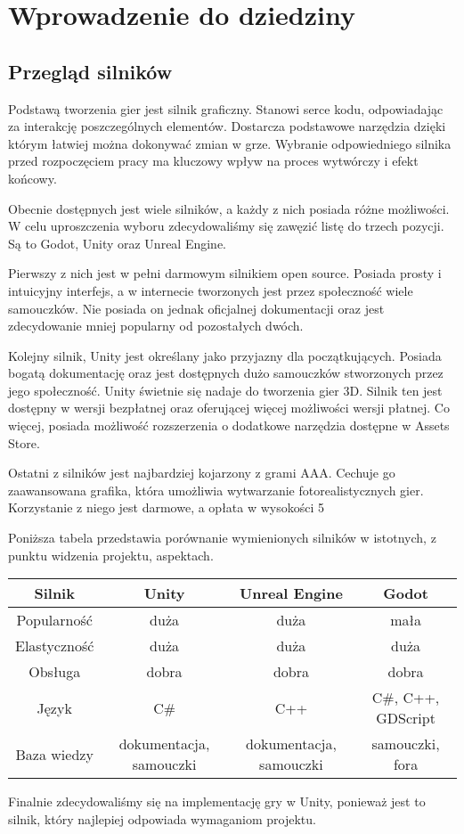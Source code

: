 \chapter{Wprowadzenie do dziedziny}\label{chap:field}

\section{Przegląd silników}
Podstawą tworzenia gier jest silnik graficzny. Stanowi serce kodu, odpowiadając za interakcję poszczególnych elementów. Dostarcza podstawowe narzędzia dzięki którym łatwiej można dokonywać zmian w grze. Wybranie odpowiedniego silnika przed rozpoczęciem pracy ma kluczowy wpływ na proces wytwórczy i efekt końcowy.

Obecnie dostępnych jest wiele silników, a każdy z nich posiada różne możliwości. W celu uproszczenia wyboru zdecydowaliśmy się zawęzić listę do trzech pozycji. Są to Godot, Unity oraz Unreal Engine.

Pierwszy z nich jest w pełni darmowym silnikiem open source. Posiada prosty i intuicyjny interfejs, a w internecie tworzonych jest przez społeczność wiele samouczków. Nie posiada on jednak oficjalnej dokumentacji oraz jest zdecydowanie mniej popularny od pozostałych dwóch.

Kolejny silnik, Unity jest określany jako przyjazny dla początkujących. Posiada bogatą dokumentację oraz jest dostępnych dużo samouczków stworzonych przez jego społeczność. Unity świetnie się nadaje do tworzenia gier 3D. Silnik ten jest dostępny w wersji bezpłatnej oraz oferującej więcej możliwości wersji płatnej. Co więcej, posiada możliwość rozszerzenia o dodatkowe narzędzia dostępne w Assets Store.

Ostatni z silników jest najbardziej kojarzony z grami AAA. Cechuje go zaawansowana grafika, która umożliwia wytwarzanie fotorealistycznych gier. Korzystanie z niego jest darmowe, a opłata w wysokości 5%

Poniższa tabela przedstawia porównanie wymienionych silników w istotnych, z punktu widzenia projektu, aspektach.

\begin{table}[h]
\begin{center}
\begin{tabular}{ |c||c|c|c| }
 \hline
 Silnik & Unity & Unreal Engine & Godot \\
 \hline \hline
 Popularność & duża & duża & mała \\
 \hline
 Elastyczność & duża & duża & duża \\
 \hline
 Obsługa & dobra & dobra & dobra \\
 \hline
 Język & C\# & C++ & C\#, C++, GDScript \\
 \hline
 Baza wiedzy & dokumentacja,  samouczki & dokumentacja, samouczki & samouczki, fora \\
 \hline
\end{tabular}
\end{center}
\end{table}

Finalnie zdecydowaliśmy się na implementację gry w Unity, ponieważ jest to silnik, który najlepiej odpowiada wymaganiom projektu.